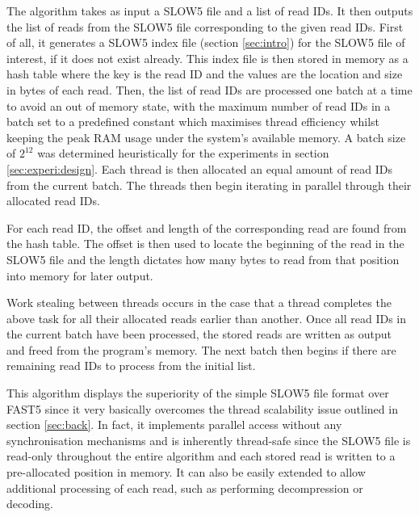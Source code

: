 The algorithm takes as input a SLOW5 file and a list of read IDs. It then outputs the list of reads from the SLOW5 file corresponding to the given read IDs. First of all, it generates a SLOW5 index file (section \ref{sec:intro}) for the SLOW5 file of interest, if it does not exist already. This index file is then stored in memory as a hash table where the key is the read ID and the values are the location and size in bytes of each read. Then, the list of read IDs are processed one batch at a time to avoid an out of memory state, with the maximum number of read IDs in a batch set to a predefined constant which maximises thread efficiency whilst keeping the peak RAM usage under the system's available memory. A batch size of $2^{12}$ was determined heuristically for the experiments in section \ref{sec:experi:design}. Each thread is then allocated an equal amount of read IDs from the current batch. The threads then begin iterating in parallel through their allocated read IDs.

For each read ID, the offset and length of the corresponding read are found from the hash table. The offset is then used to locate the beginning of the read in the SLOW5 file and the length dictates how many bytes to read from that position into memory for later output.

Work stealing between threads occurs in the case that a thread completes the above task for all their allocated reads earlier than another. Once all read IDs in the current batch have been processed, the stored reads are written as output and freed from the program's memory. The next batch then begins if there are remaining read IDs to process from the initial list.

This algorithm displays the superiority of the simple SLOW5 file format over FAST5 since it very basically overcomes the thread scalability issue outlined in section \ref{sec:back}. In fact, it implements parallel access without any synchronisation mechanisms and is inherently thread-safe since the SLOW5 file is read-only throughout the entire algorithm and each stored read is written to a pre-allocated position in memory. It can also be easily extended to allow additional processing of each read, such as performing decompression or decoding.
